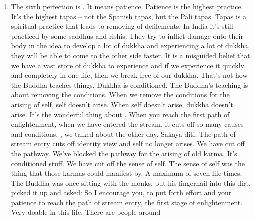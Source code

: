 \documentclass[letterpaper,10pt,english]{sphinxmanual}
\begin{document}
\begin{enumerate}
\item {} 
\sphinxAtStartPar
The  sixth  perfection  is
.  It  means  patience.  Patience  is  the
highest practice. It’s the highest tapas – not the Spanish tapas, but the
Pali tapas. Tapas is a spiritual practice that leads to removing of defilements. In India it’s still practiced by some saddhus and rishis. They try
to inflict damage onto their body in the idea to develop a lot of dukkha
and experiencing a lot of dukkha, they will be able to come to the other
side faster. It is a misguided belief that we have a vast store of dukkha
to  experience  and  if  we  experience  it  quickly  and  completely  in  one
life,  then  we  break  free  of  our  dukkha.  That’s  not  how  the  Buddha
teaches things. Dukkha is conditioned. The Buddha’s teaching is about
removing the conditions. When we remove the conditions for the arising of self, self doesn’t arise. When self doesn’t arise, dukkha doesn’t
arise. It’s the wonderful thing about
. When you reach the
first path of enlightenment, when we have entered the stream, it cuts
off so many causes and conditions.
, we talked
about the other day. Sakaya diti. The path of stream entry cuts off identity view and self no longer arises.
We have cut off the pathway. We’ve blocked the pathway
for the arising of old karma. It’s conditioned stuff. We have cut off the
sense of self. The sense of self was the thing that those karmas could
manifest  by. A  maximum  of  seven  life  times. The  Buddha  was  once
sitting  with  the  monks,  put  his  fingernail  into  this  dirt,  picked  it  up
 and asked:
So I encourage you, to put forth effort and your patience to reach the path of stream entry, the first stage
of  enlightenment.  Very  doable  in  this  life.  There  are  people  around

\end{enumerate}
\end{document}
